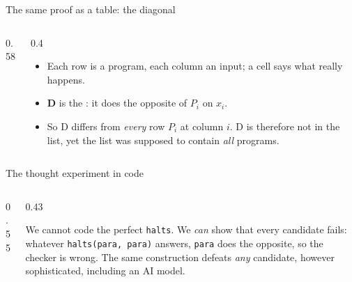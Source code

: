\begin{frame}{The same proof as a table: the diagonal}
\begin{columns}[c]
\begin{column}{0.58\textwidth}
\begin{sfig}[0.72]
\end{sfig}
\end{column}
\begin{column}{0.4\textwidth}
\small
\begin{itemize}\setlength\itemsep{2mm}
\item Each row is a program, each column an input; a cell says what really happens.
\item \textbf{D} is the : it does the opposite of $P_i$ on $x_i$.
\item So D differs from \emph{every} row $P_i$ at column $i$. D is therefore not in the list, yet the list was supposed to contain \emph{all} programs.
\end{itemize}
\end{column}
\end{columns}
\end{frame}

\begin{frame}{The thought experiment in code}
\begin{columns}[T]
\begin{column}{0.55\textwidth}
\end{column}
\begin{column}{0.43\textwidth}
\vspace{1mm}\pyline
\vspace{2mm}

{\footnotesize We cannot code the perfect \texttt{halts}. We \emph{can} show that every candidate fails: whatever \texttt{halts(para, para)} answers, \texttt{para} does the opposite, so the checker is wrong. The same construction defeats \emph{any} candidate, however sophisticated, including an AI model.}
\end{column}
\end{columns}
\end{frame}

